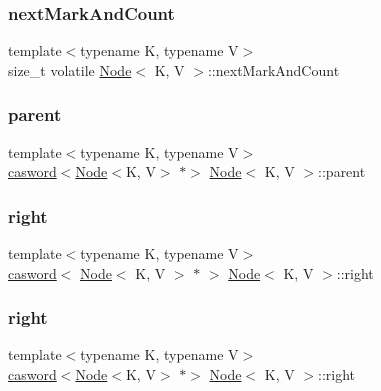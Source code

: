 \subsubsection{\texorpdfstring{next\+Mark\+And\+Count}{nextMarkAndCount}}
{\footnotesize\ttfamily template$<$typename K, typename V$>$ \\
size\+\_\+t volatile \hyperlink{classNode}{Node}$<$ K, V $>$\+::next\+Mark\+And\+Count}

\mbox{\label{classNode_a6393b3996b6bbae601841635eafad7a4}} 
\subsubsection{\texorpdfstring{parent}{parent}}
{\footnotesize\ttfamily template$<$typename K, typename V$>$ \\
\hyperlink{structcasword}{casword}$<$\hyperlink{classNode}{Node}$<$K, V$>$ $\ast$$>$ \hyperlink{classNode}{Node}$<$ K, V $>$\+::parent}

\mbox{\label{classNode_a1075c82d0b5b7ca91ce4d37b1d651b30}} 
\subsubsection{\texorpdfstring{right}{right}\hspace{0.1cm}{\footnotesize\ttfamily [1/2]}}
{\footnotesize\ttfamily template$<$typename K, typename V$>$ \\
\hyperlink{structcasword}{casword}$<$ \hyperlink{classNode}{Node}$<$ K, V $>$ $\ast$ $>$ \hyperlink{classNode}{Node}$<$ K, V $>$\+::right}

\mbox{\label{classNode_afa1cf8bdbcc54a575704def2de4ab22f}} 
\subsubsection{\texorpdfstring{right}{right}\hspace{0.1cm}{\footnotesize\ttfamily [2/2]}}
{\footnotesize\ttfamily template$<$typename K, typename V$>$ \\
\hyperlink{structcasword}{casword}$<$\hyperlink{classNode}{Node}$<$K, V$>$ $\ast$$>$ \hyperlink{classNode}{Node}$<$ K, V $>$\+::right}

